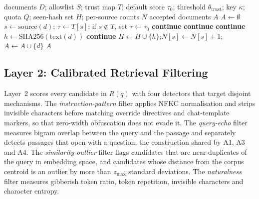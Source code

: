 \begin{algorithm}[H]
\caption{Layer 1: ingestion-time source verification}
\label{alg:l1}
\begin{algorithmic}[1]
\Require documents $D$; allowlist $S$; trust map $T$; default score $\tau_0$;
threshold $\theta_{\mathrm{trust}}$;
key $\kappa$; quota $Q$; seen-hash set $H$; per-source counts $N$
\Ensure accepted documents $A$
\State $A \gets \emptyset$
  \State $s \gets \mathrm{source}(d)$; $\tau \gets T[s]$; if $s \notin T$, set $\tau \gets \tau_0$
   \State \textbf{continue}  \EndIf
   \State \textbf{continue}  \EndIf
  \If{$\kappa \neq \bot$}
        \State \textbf{continue} 
     \EndIf
  \EndIf
  \State $h \gets \mathrm{SHA256}(\mathrm{text}(d))$
   \State \textbf{continue}  \EndIf
  \State $H \gets H \cup \{h\}$;\quad $N[s] \gets N[s] + 1$;\quad $A \gets A \cup \{d\}$
\EndFor
\State \Return $A$
\end{algorithmic}
\end{algorithm}

\subsection{Layer 2: Calibrated Retrieval Filtering}
\label{sec:l2}

Layer~2 scores every candidate in $R(q)$ with four detectors that target disjoint mechanisms.
The \emph{instruction-pattern} filter applies NFKC normalisation and strips invisible
characters before matching override directives and chat-template markers, so that zero-width
obfuscation does not evade it. The \emph{query-echo} filter measures bigram overlap between the
query and the passage and separately detects passages that open with a question, the
construction shared by A1, A3 and A4. The \emph{similarity-outlier} filter flags candidates
that are near-duplicates of the query in embedding space, and candidates whose distance from
the corpus centroid is an outlier by more than $z_{\max}$ standard deviations. The
\emph{naturalness} filter measures gibberish token ratio, token repetition, invisible
characters and character entropy.

